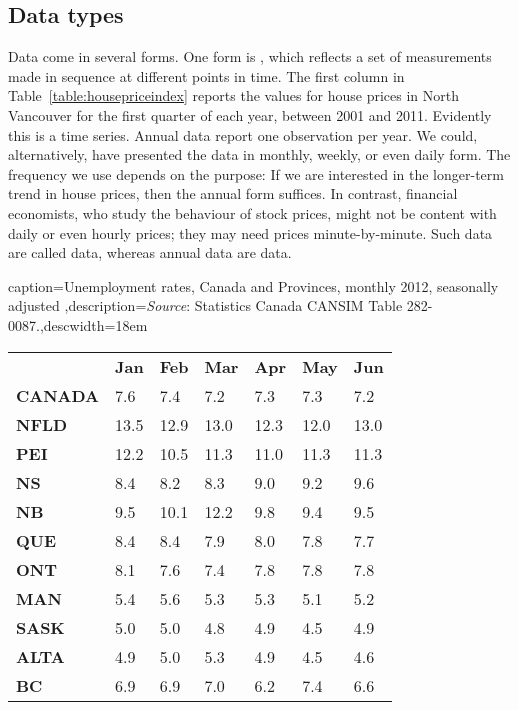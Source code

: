 \newhtmlpage

\subsection*{Data types}

Data come in several forms. One form is , which
reflects a set of measurements made in sequence at different points in time.
The first column in Table~\ref{table:housepriceindex} reports the values for
house prices in North Vancouver for the first quarter of each year, between
2001 and 2011. Evidently this is a time series. Annual data report one
observation per year. We could, alternatively, have presented the data in
monthly, weekly, or even daily form. The frequency we use depends on the
purpose: If we are interested in the longer-term trend in house prices, then
the annual form suffices. In contrast, financial economists, who study the
behaviour of stock prices, might not be content with daily or even hourly
prices; they may need prices minute-by-minute. Such data are called %
 data, whereas annual data are %
 data.

\begin{Table}{caption={Unemployment rates, Canada and Provinces, monthly 2012, seasonally adjusted \label{table:unemprate2012}},description={\textit{Source}: Statistics Canada CANSIM Table 282-0087.},descwidth={18em}}
\begin{tabu} to 35em {|X[2.5,l]X[1,c]X[1,c]X[1,c]X[1,c]X[1,c]X[1,c]|}
	\hline 
						& \textbf{Jan} & \textbf{Feb} & \textbf{Mar} & \textbf{Apr} & \textbf{May}  & \textbf{Jun} \\
	\textbf{CANADA}	& 7.6 & 7.4 & 7.2 & 7.3 & 7.3 & 7.2 \\
		\textbf{NFLD}	& 13.5 & 12.9 & 13.0 & 12.3 & 12.0 & 13.0 \\
	\textbf{PEI} 	& 12.2 & 10.5 & 11.3 & 11.0 & 11.3 & 11.3 \\ 
		\textbf{NS} 	& 8.4 & 8.2 & 8.3 & 9.0 & 9.2 & 9.6 \\
	\textbf{NB} 	& 9.5 & 10.1 & 12.2 & 9.8 & 9.4 & 9.5 \\
		\textbf{QUE} 	& 8.4 & 8.4 & 7.9 & 8.0 & 7.8 & 7.7 \\ 
	\textbf{ONT} 	& 8.1 & 7.6 & 7.4 & 7.8 & 7.8 & 7.8 \\ 
		\textbf{MAN} 	& 5.4 & 5.6 & 5.3 & 5.3 & 5.1 & 5.2 \\
	\textbf{SASK} 	& 5.0 & 5.0 & 4.8 & 4.9 & 4.5 & 4.9 \\ 
		\textbf{ALTA}	& 4.9 & 5.0 & 5.3 & 4.9 & 4.5 & 4.6 \\ 
	\textbf{BC}		& 6.9 & 6.9 & 7.0 & 6.2 & 7.4 & 6.6 \\ \hline 
\end{tabu}
\end{Table}


